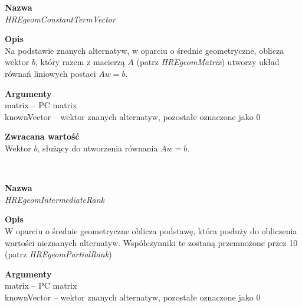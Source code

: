 \begin{spacing}{1.0}
\begin{spacing}{1.2}
\begin{spacing}{1.2}
\begin{spacing}{1.2}
\begin{spacing}{1.1}
\begin{spacing}{1.1}
\begin{spacing}{1.1}
\textbf{Nazwa}\\  \emph{HREgeomConstantTermVector} \\ \begin{spacing}{0.3}  \end{spacing}
 
\textbf{Opis}\\ Na podstawie znanych alternatyw, w oparciu o średnie geometryczne, oblicza wektor $b$, który razem z macierzą $A$
(patrz \textit{HREgeomMatrix}) utworzy układ równań liniowych postaci $Aw = b$. \\ \begin{spacing}{0.3}  \end{spacing}
 
\textbf{Argumenty} \\
matrix -- PC matrix \\
knownVector -- wektor znanych alternatyw, pozostałe oznaczone jako $0$ \\ \begin{spacing}{0.3}  \end{spacing}

\textbf{Zwracana wartość}\\ Wektor $b$, służący do utworzenia równania $Aw = b$. \\ \begin{spacing}{0.3}  \end{spacing}


\newpage
\begin{spacing}{1.2}
 \\ \begin{spacing}{0.5}  \end{spacing}

\textbf{Nazwa}\\  \emph{HREgeomIntermediateRank} \\ \begin{spacing}{0.3}  \end{spacing}
 
\textbf{Opis}\\ W oparciu o średnie geometryczne oblicza podstawę, która posłuży do obliczenia wartości nieznanych alternatyw. Współczynniki te zostaną przemnożone przez 10 (patrz \textit{HREgeomPartialRank}) \\  \begin{spacing}{0.3}  \end{spacing}
 
\textbf{Argumenty} \\
matrix -- PC matrix \\
knownVector -- wektor znanych alternatyw, pozostałe oznaczone jako $0$ \\ \begin{spacing}{0.3}  \end{spacing}


\end{spacing}
\end{spacing}
\end{spacing}
\end{spacing}
\end{spacing}
\end{spacing}
\end{spacing}
\end{spacing}
